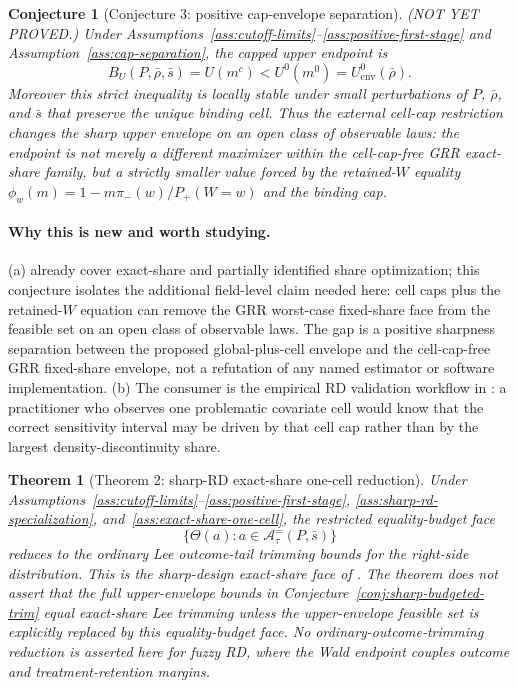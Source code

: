 \documentclass[11pt]{article}
\theoremstyle{definition}
\theoremstyle{plain}
\newtheorem{theorem}{Theorem}
\newtheorem{conjecture}{Conjecture}
\theoremstyle{remark}
\begin{document}
\begin{conjecture}[Conjecture 3: positive cap-envelope separation]\label{conj:cap-separation}
(NOT YET PROVED.)  Under Assumptions~\ref{ass:cutoff-limits}--\ref{ass:positive-first-stage}
and Assumption~\ref{ass:cap-separation}, the capped upper endpoint is
\[
  B_U(P,\bar\rho,\bar s)=U(m^c)<U^0(m^0)=U^0_{\mathrm{env}}(\bar\rho).
\]
Moreover this strict inequality is locally stable under small perturbations of \(P\),
\(\bar\rho\), and \(\bar s\) that preserve the unique binding cell.  Thus the external
cell-cap restriction changes the sharp upper envelope on an open class of observable laws:
the endpoint is not merely a different maximizer within the cell-cap-free GRR exact-share
family, but a strictly smaller value forced by the retained-\(W\) equality
\(\phi_w(m)=1-m\pi_-(w)/P_+(W=w)\) and the binding cap.
\end{conjecture}

\paragraph{Why this is new and worth studying.}
(a) \citet{GerardRokkanenRothe2020} already cover exact-share and partially identified
share optimization; this conjecture isolates the additional field-level claim needed here:
cell caps plus the retained-\(W\) equation can remove the GRR worst-case fixed-share face
from the feasible set on an open class of observable laws.  The gap is a positive sharpness
separation between the proposed global-plus-cell envelope and the cell-cap-free GRR
fixed-share envelope, not a refutation of any named estimator or software implementation.
(b) The consumer is the empirical RD validation workflow in
\citet{CattaneoIdroboTitiunik2020}: a practitioner who observes one problematic covariate
cell would know that the correct sensitivity interval may be driven by that cell cap rather
than by the largest density-discontinuity share.

\begin{theorem}[Theorem 2: sharp-RD exact-share one-cell reduction]\label{thm:exact-share-face}
Under Assumptions~\ref{ass:cutoff-limits}--\ref{ass:positive-first-stage},
\ref{ass:sharp-rd-specialization}, and~\ref{ass:exact-share-one-cell}, the restricted
equality-budget face
\[
  \{\Theta(a):a\in\mathcal A^{=}_\tau(P,\bar s)\}
\]
reduces to the ordinary Lee outcome-tail trimming bounds for the right-side distribution.
This is the sharp-design exact-share face of \citet{GerardRokkanenRothe2020}.  The theorem
does not assert that the full upper-envelope bounds in
Conjecture~\ref{conj:sharp-budgeted-trim} equal exact-share Lee trimming unless the
upper-envelope feasible set is explicitly replaced by this equality-budget face.  No
ordinary-outcome-trimming reduction is asserted here for fuzzy RD, where the Wald endpoint
couples outcome and treatment-retention margins.
\end{theorem}
\end{document}
